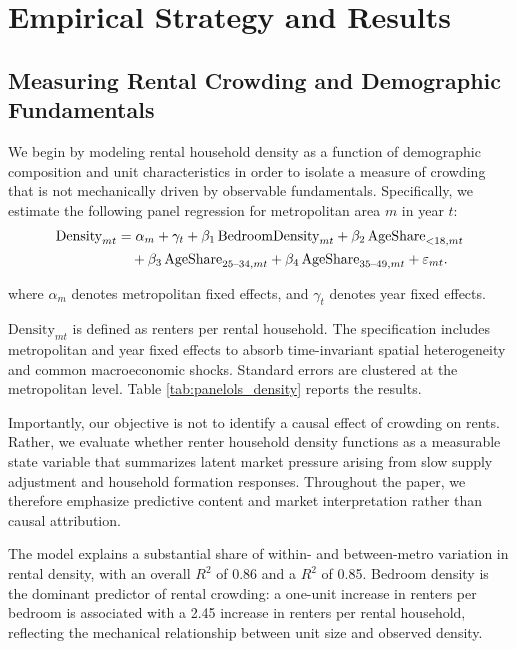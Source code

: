 \documentclass[pdflatex,sn-basic]{sn-jnl}%
\theoremstyle{thmstyleone}%
\theoremstyle{thmstyletwo}%
\theoremstyle{thmstylethree}%
\begin{document}
\section{Empirical Strategy and Results}\label{section4}
\subsection{Measuring Rental Crowding and Demographic Fundamentals}

We begin by modeling rental household density as a function of demographic composition and unit characteristics in order to isolate a measure of crowding that is not mechanically driven by observable fundamentals. Specifically, we estimate the following panel regression for metropolitan area $m$ in year $t$:
\begin{align}
\text{Density}_{m t}
&=
\alpha_m
+
\gamma_t
+
\beta_1 \, \text{BedroomDensity}_{m t}
+
\beta_2 \, \text{AgeShare}_{<18, m t} \notag \\
&\quad
+
\beta_3 \, \text{AgeShare}_{25\text{--}34, m t}
+
\beta_4 \, \text{AgeShare}_{35\text{--}49, m t}
+
\varepsilon_{m t}.
\end{align}

where $\alpha_m$ denotes metropolitan fixed effects, and $\gamma_t$ denotes year fixed effects.

$\text{Density}_{m t}$ is defined as renters per rental household. The specification includes metropolitan and year fixed effects to absorb time-invariant spatial heterogeneity and common macroeconomic shocks. Standard errors are clustered at the metropolitan level. Table \ref{tab:panelols_density} reports the results.



Importantly, our objective is not to identify a causal effect of crowding on rents. Rather, we evaluate whether renter household density functions as a measurable state variable that summarizes latent market pressure arising from slow supply adjustment and household formation responses. Throughout the paper, we therefore emphasize predictive content and market interpretation rather than causal attribution.

The model explains a substantial share of within- and between-metro variation in rental density, with an overall $R^{2}$ of 0.86 and a $R^{2}$ of 0.85. Bedroom density is the dominant predictor of rental crowding: a one-unit increase in renters per bedroom is associated with a 2.45 increase in renters per rental household, reflecting the mechanical relationship between unit size and observed density.
\end{document}
